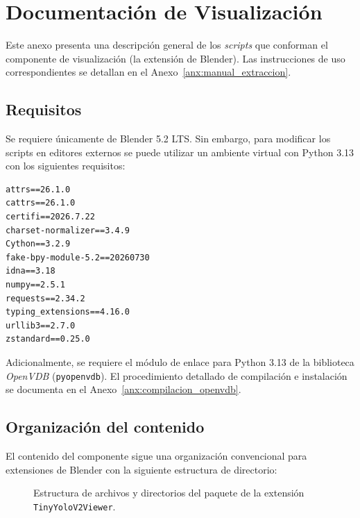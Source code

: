 \chapter{Documentación de Visualización}
\label{anx:doc_visualizacion}
Este anexo presenta una descripción general de los \textit{scripts} que conforman el componente de visualización (la extensión de Blender). 
Las instrucciones de uso correspondientes se detallan en el Anexo~\ref{anx:manual_extraccion}.

\section{Requisitos}
Se requiere únicamente de Blender 5.2 LTS. Sin embargo, para modificar los scripts en editores
externos se puede utilizar un ambiente virtual con Python 3.13 con los siguientes
requisitos:

\begin{verbatim}
attrs==26.1.0
cattrs==26.1.0
certifi==2026.7.22
charset-normalizer==3.4.9
Cython==3.2.9
fake-bpy-module-5.2==20260730
idna==3.18
numpy==2.5.1
requests==2.34.2
typing_extensions==4.16.0
urllib3==2.7.0
zstandard==0.25.0
\end{verbatim}

Adicionalmente, se requiere el módulo de enlace para Python 3.13 de la biblioteca \textit{OpenVDB} (\texttt{pyopenvdb}). 
El procedimiento detallado de compilación e instalación se documenta en el Anexo~\ref{anx:compilacion_openvdb}.

\section{Organización del contenido}
El contenido del componente sigue una organización convencional para extensiones de Blender con la siguiente estructura
de directorio:
\begin{figure}[!htbp]
\caption{Estructura de archivos y directorios del paquete de la extensión \texttt{TinyYoloV2Viewer}.}
\label{fig:arbol_extension_blender}
\end{figure}

